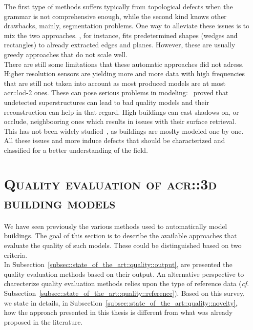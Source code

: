         The first type of methods suffers typically from topological defects when the grammar is not comprehensive enough, while the second kind knows other drawbacks, mainly, segmentation problems.
        One way to alleviate these issues is to mix the two approaches.
        \textcite{werner2002new}, for instance, fits predetermined shapes (wedges and rectangles) to already extracted edges and planes.
        However, these are usually greedy approaches that do not scale well.\\

        There are still some limitations that these automatic approaches did not adress.
        Higher resolution sensors are yielding more and more data with high frequencies that are still not taken into account as most produced models are at most \gls{acr::lod}-2 ones.
        These can pose serious problems in modeling:~\textcite{bredif20073d} proved that undetected superstructures can lead to bad quality models and their reconstruction can help in that regard.
        High buildings can cast shadows on, or occlude, neighbooring ones which results in issues with their surface retrieval.
        This has not been widely studied~\parencite{lafarge2012creating,bao2013generating}, as buildings are moslty modeled one by one.
        All these issues and more induce defects that should be characterized and classified for a better understanding of the field.

\section{\textsc{Quality evaluation of \texorpdfstring{\gls*{acr::3d}}{3D} building models}}
    \label{sec::state_of_the_art::quality}
    We have seen previously the various methods used to automatically model buildings.
    The goal of this section is to describe the available approaches that evaluate the quality of such models.
    These could be distinguished based on two criteria.\\
    In Subsection~\ref{subsec::state_of_the_art::quality::output}, are presented the quality evaluation methods based on their output.
    An alternative perspective to charecterize quality evaluation methods relies upon the type of reference data (\textit{cf.} Subsection~\ref{subsec::state_of_the_art::quality::reference}).
    Based on this survey, we state in details, in Subsection~\ref{subsec::state_of_the_art::quality::novelty}, how the approach presented in this thesis is different from what was already proposed in the literature.

